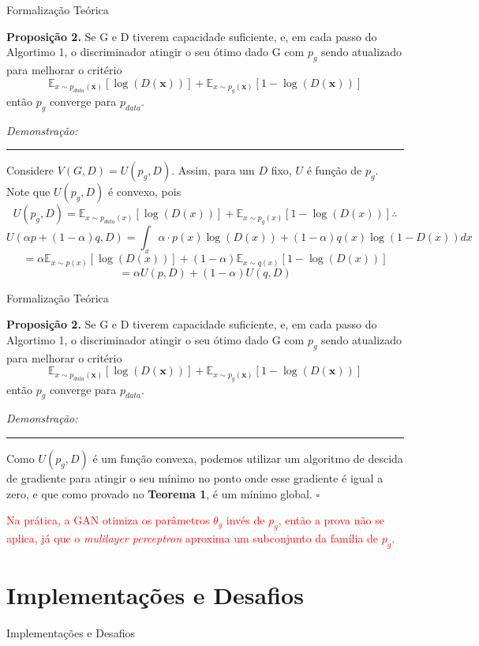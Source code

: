 \documentclass[10pt]{beamer}
\newcommand*{\QEDB}{\hfill\ensuremath{\square}}%
\begin{document}
\begin{frame}[fragile]{Formalização Teórica}

	\small
	\textbf{Proposição 2.} Se G e D tiverem capacidade suficiente,
	e, em cada passo do Algortimo 1, o discriminador atingir o seu
	ótimo dado G com $p_g$ sendo atualizado para melhorar o critério
    $$
    \mathbb{E}_{x\sim p_{data}(\bm x)}\left[\log{(D(\bm x))}\right]+
    \mathbb{E}_{x\sim p_g(\bm x)}\left[1-\log{(D(\bm x))}\right]
    $$
    então $p_g$ converge para $p_{data}$.

	\textit{Demonstração:}
	\hrule

	Considere $V(G,D) = U(p_g,D)$. Assim, para um $D$ fixo, $U$ é
	função de $p_g$. Note que $U(p_g,D)$ é convexo, pois
	$$ U(p_g,D) =
    \mathbb{E}_{x\sim p_{data}(x)}\left[\log{(D(x))}\right]+
    \mathbb{E}_{x\sim p_g(x)}\left[1-\log{(D(x))}\right] \therefore
	$$
	\pause
	$$U(\alpha p + (1-\alpha)q,D) =
	\int_x \alpha\cdot p(x)\log{(D(x))} + (1-\alpha)q(x)\log{(1-D(x))}dx
	$$
	$$
	=
    \alpha\mathbb{E}_{x\sim p(x)}\left[\log{(D(x))}\right]+
    (1-\alpha)\mathbb{E}_{x\sim q(x)}\left[1-\log{(D(x))}\right]
	$$
	$$
	= \alpha U(p,D) + (1-\alpha)U(q,D)
	$$

\end{frame}

\begin{frame}[fragile]{Formalização Teórica}

	\small
	\textbf{Proposição 2.} Se G e D tiverem capacidade suficiente,
	e, em cada passo do Algortimo 1, o discriminador atingir o seu
	ótimo dado G com $p_g$ sendo atualizado para melhorar o critério
    $$
    \mathbb{E}_{x\sim p_{data}(\bm x)}\left[\log{(D(\bm x))}\right]+
    \mathbb{E}_{x\sim p_g(\bm x)}\left[1-\log{(D(\bm x))}\right]
    $$
    então $p_g$ converge para $p_{data}$.

	\textit{Demonstração:}
	\hrule

	Como $U(p_g,D)$ é um função convexa, podemos utilizar um algoritmo
	de descida de gradiente para atingir o seu mínimo no ponto
	onde esse gradiente é igual a zero, e que como provado
	no \textbf{Teorema 1}, é um mínimo global.
	\QEDB
	\pause

	\textcolor{red}{Na prática, a GAN otimiza os parâmetros
	$\theta_g$ invés de $p_g$, então a prova não se aplica,
	já que o \textit{mulilayer perceptron} aproxima um subconjunto
	da família de $p_g$.}

\end{frame}

\AtBeginSection{}
\section[Desafios]{Implementações e Desafios}
\begin{frame}[fragile]{Implementações e Desafios}


\end{frame}
\end{document}
